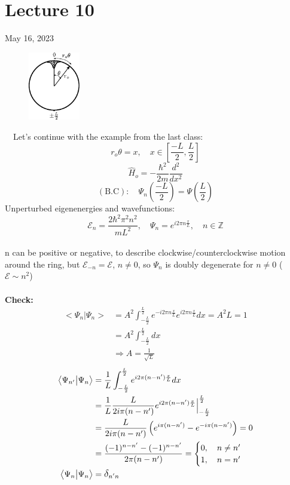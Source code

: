 \documentclass[12pt,fancychapters]{report}
\numberwithin{equation}{section}
\begin{document}
\section{Lecture 10}
May 16, 2023\\
\begin{figure}
  \begin{center}
    \includegraphics[width=0.2\textwidth]{../Figures/1D_LP.pdf}
  \end{center}
\end{figure}
\
\
Let's continue with the example from the last class: 
\[r_o \theta = x, \quad x \in \left[\frac{-L}{2}, \frac{L}{2} \right]\]
\[\hat{H}_o = -\frac{\hbar^2}{2m}\frac{d^2}{dx^2}\]
\[\left(\text{B.C}\right):\quad \Psi_n\left(\frac{-L}{2}\right) =
  \Psi\left(\frac{L}{2}\right)
\]
Unperturbed eigenenergies and wavefunctions:
\[
  \mathcal{E}_n = \frac{2\hbar^2 \pi^2 n^2}{mL^2},\quad \Psi_n = e^{i 2\pi n \frac{x}{L}},
  \quad n \in \mathbb{Z}
\]\\
n can be positive or negative, to describe clockwise/counterclockwise motion around the ring, but 
$\mathcal{E}_{-n} = \mathcal{E}$, $n \neq 0$, so $\Psi_n$ is doubly degenerate for 
$n\neq 0$ ($\mathcal{E}\sim n^2$)\\
\\
\textbf{Check:}
\begin{align*}
  \big<\Psi_n\big|\Psi_n\big> &= A^2 \int_{-\frac{L}{2}}^{\frac{L}{2}} e^{-i2\pi n \frac{x}{L}}
  e^{i2\pi n \frac{x}{L}}dx = A^2 L = 1\\
 &= A^2\int_{-\frac{L}{2}}^{\frac{L}{2}} dx \\
 &\Rightarrow \boxed{A = \frac{1}{\sqrt{L}}}
\end{align*}
\begin{align*}
  \big<\Psi_{n'}\big|\Psi_n\big> &= \frac{1}{L}
   \int_{-\frac{L}{2}}^{\frac{L}{2}} e^{i2\pi(n-n') \frac{x}{L}}dx\\
  &= \frac{1}{L}\frac{L}{2i\pi (n-n') }e^{i2\pi(n-n') \frac{x}{L}}\Big|_{-\frac{L}{2}}^{\frac{L}{2}}\\
  &=\frac{L}{2i\pi (n-n') } \left(e^{i\pi(n-n')} -e^{-i\pi(n-n')}  \right)=0\\
  &= \frac{(-1)^{n-n'} - (-1)^{n-n'}}{2\pi(n-n')} = \begin{cases} 0,\quad n\neq n'\\ 
    1, \quad n = n'\\
  \end{cases}\\
  \big<\Psi_n\big|\Psi_n\big> &= \mathlarger{\delta}_{n'n}
\end{align*}
\end{document}

